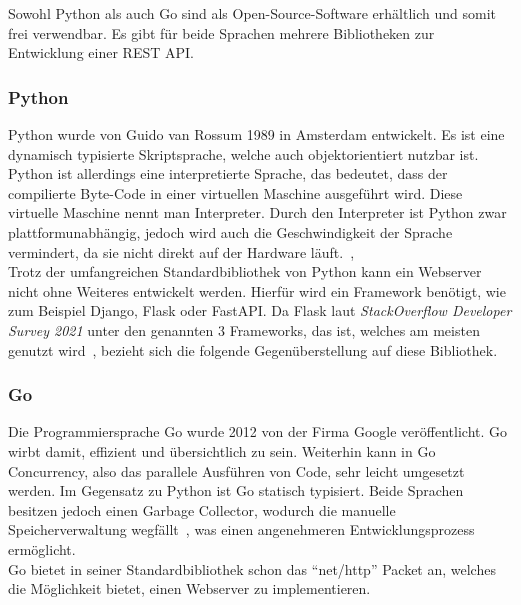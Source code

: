 Sowohl Python als auch Go sind als \gls{Open-Source}-Software erhältlich und somit frei verwendbar. Es 
gibt für beide Sprachen mehrere Bibliotheken zur Entwicklung einer \gls{REST} 
\gls{API}.

\subsubsection{Python}
Python wurde von Guido van Rossum 1989 in Amsterdam entwickelt. Es ist eine 
\gls{dynamisch typisiert}e Skriptsprache, welche auch \gls{objektorientiert} nutzbar 
ist. Python ist allerdings eine interpretierte Sprache, das bedeutet, dass der 
compilierte Byte-Code in einer virtuellen Maschine ausgeführt wird. Diese 
virtuelle Maschine nennt man Interpreter. Durch den Interpreter ist Python 
zwar plattformunabhängig, jedoch wird auch die Geschwindigkeit der Sprache vermindert,
da sie nicht direkt auf der Hardware läuft.~\cite{ErKa20},\\

Trotz der umfangreichen Standardbibliothek von Python kann ein Webserver nicht
ohne Weiteres entwickelt werden. Hierfür wird ein \gls{Framework} benötigt, wie 
zum Beispiel Django, Flask oder FastAPI. Da Flask laut \textit{StackOverflow 
Developer Survey 2021} unter den genannten 3 Frameworks, das ist, welches am 
meisten genutzt wird~\cite{Sta21}, bezieht sich die folgende Gegenüberstellung 
auf diese Bibliothek. \\

\subsubsection{Go}
Die Programmiersprache Go wurde 2012 von der Firma Google veröffentlicht. Go 
wirbt damit, effizient und übersichtlich zu sein. Weiterhin kann in Go 
Concurrency, also das parallele Ausführen von Code, sehr leicht umgesetzt werden.
Im Gegensatz zu Python ist Go \gls{statisch typisiert}. Beide Sprachen besitzen jedoch
einen \gls{Garbage Collector}, wodurch die manuelle Speicherverwaltung
wegfällt~\cite{Freeman2022}, was einen angenehmeren Entwicklungsprozess ermöglicht. \\

Go bietet in seiner Standardbibliothek schon das ``net/http'' Packet an, welches
die Möglichkeit bietet, einen Webserver zu implementieren. 


